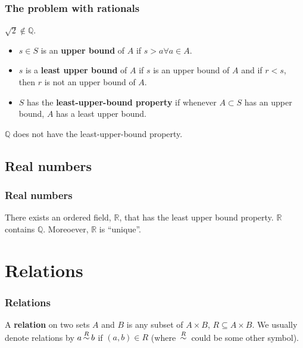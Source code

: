 \documentclass[compress]{beamer}
\def\rel{\,{\buildrel R \over \sim}\,}
\begin{document}
\begin{frame}
  \frametitle{The problem with rationals}
  \begin{theorem}
    $\sqrt{2} \not\in \mathbb{Q}$.
  \end{theorem}
  \begin{itemize}
  \item $s \in S$ is an \textbf{upper bound} of $A$ if $s > a \forall
    a \in A$.
  \item $s$ is a \textbf{least upper bound} of $A$ if $s$ is an upper
    bound of $A$ and if $r < s$, then $r$ is not an upper bound of
    $A$. 
  \item $S$ has the \textbf{least-upper-bound property} if whenever $A
    \subset S$ has an upper bound, $A$ has a least upper bound.
  \end{itemize}
  \begin{theorem}
    $\mathbb{Q}$ does not have the least-upper-bound property.
  \end{theorem}
\end{frame}

\subsection{Real numbers}
\begin{frame}
  \frametitle{Real numbers}
  \begin{theorem}
    There exists an ordered field, $\mathbb{R}$, that has the least
    upper bound property. $\mathbb{R}$ contains $\mathbb{Q}$. Moreoever,
    $\mathbb{R}$ is ``unique''.
  \end{theorem}
\end{frame}

\section{Relations}

\begin{frame}\frametitle{Relations}
  \begin{definition}[Relation]
    A \textbf{relation} on two sets $A$ and $B$ is any subset of $A
    \times B$, $R \subseteq A \times B$. We usually denote relations by
    $a \rel b$ if $(a,b) \in R$ (where $\rel$ could be some other symbol).
  \end{definition}
\end{frame}
\end{document}
